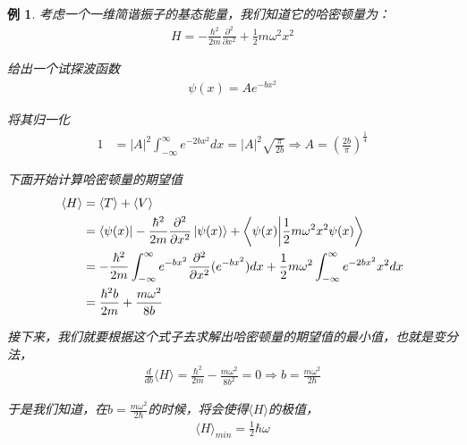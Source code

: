 \documentclass{article}
\newtheorem{example}{例}
\newcommand{\expectation}[1]{\langle #1 \rangle}
\begin{document}
\begin{example}
	考虑一个一维简谐振子的基态能量，我们知道它的哈密顿量为：
	\begin{align*}
		H=-\frac{\hbar^2}{2m}\frac{\partial^2}{\partial x^2}+\frac{1}{2}m\omega^2x^2
	\end{align*}

	给出一个试探波函数
	\begin{align*}
		\psi(x)=Ae^{-bx^2}
	\end{align*}

	将其归一化
	\begin{align*}
		1 & =|A|^2\int_{-\infty}^{\infty}e^{-2bx^2}dx=|A|^2\sqrt{\frac{\pi}{2b}}\Rightarrow A=\left(\frac{2b}{\pi}\right)^{\frac{1}{4}}
	\end{align*}

	下面开始计算哈密顿量的期望值
	\begin{align*}
		\expectation{H} & =\expectation{T}+\expectation{V}                                                                                                                            \\
		                & =\bra{\psi(x)}-\frac{\hbar^2}{2m}\frac{\partial^2}{\partial x^2}\ket{\psi(x)}+\braket{\psi(x)}{\frac{1}{2}m\omega^2x^2\psi(x)}                              \\
		                & =-\frac{\hbar^2}{2m}\int_{-\infty}^{\infty}e^{-bx^2}\frac{\partial^2}{\partial x^2}(e^{-bx^2})dx+\frac{1}{2}m\omega^2\int_{-\infty}^{\infty}e^{-2bx^2}x^2dx \\
		                & =\frac{\hbar^2b}{2m}+\frac{m\omega^2}{8b}
	\end{align*}

	接下来，我们就要根据这个式子去求解出哈密顿量的期望值的最小值，也就是变分法，
	\begin{align*}
		\frac{d}{db}\expectation{H}=\frac{\hbar^2}{2m}-\frac{m\omega^2}{8b^2}=0\Rightarrow b=\frac{m\omega^2}{2\hbar}
	\end{align*}

	于是我们知道，在$\displaystyle b=\frac{m\omega^2}{2\hbar}$的时候，将会使得$\expectation{H}$的极值，
	\begin{align*}
		\expectation{H}_{min}=\frac{1}{2}\hbar\omega
	\end{align*}
\end{example}
\end{document}
